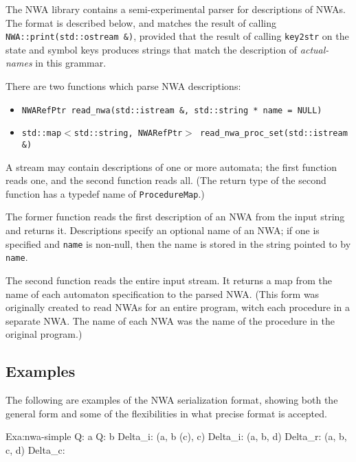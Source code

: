 The NWA library contains a semi-experimental parser for descriptions of
NWAs. The format is described below, and matches the result of calling
\texttt{NWA::print(std::ostream \&)}, provided that the result of
calling \texttt{key2str} on the state and symbol keys produces strings
that match the description of \textsl{actual-names} in this grammar.

There are two functions which parse NWA descriptions:
\begin{itemize}
  \item\texttt{NWARefPtr read\_nwa(std::istream \&, std::string * name = NULL)}
  \item\texttt{std::map$<$std::string, NWARefPtr$>$ read\_nwa\_proc\_set(std::istream \&)}
\end{itemize}
A stream may contain descriptions of one or more automata; the first
function reads one, and the second function reads all.  (The return
type of the second function has a typedef name of
\texttt{ProcedureMap}.)

The former function reads the first description of an NWA from the
input string and returns it. Descriptions specify an optional name of
an NWA; if one is specified and \texttt{name} is non-null, then the
name is stored in the string pointed to by \texttt{name}.

The second function reads the entire input stream. It returns a map
from the name of each automaton specification to the parsed NWA. (This
form was originally created to read NWAs for an entire program, witch
each procedure in a separate NWA. The name of each NWA was the name of
the procedure in the original program.)

\subsection{Examples}

The following are examples of the NWA serialization format, showing
both the general form and some of the flexibilities in what precise
format is accepted.

Exa:nwa-simple
 Q: { a }
 Q: b
 Delta\_i: (a, b (c), c)
 Delta\_i: (a, b, d)
 Delta\_r: (a, b, c, d)
 Delta\_c: {}


